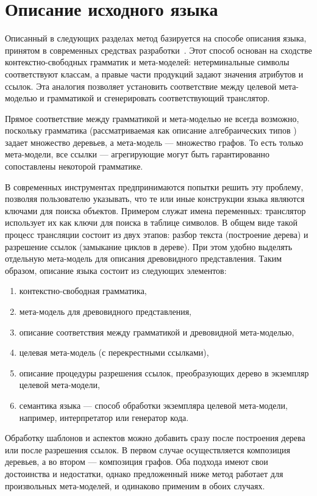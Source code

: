 \chapter{Описание исходного языка}

Описанный в следующих разделах метод базируется на способе описания языка, принятом в современных средствах разработки~\cite{xText}. Этот способ основан на сходстве контекстно-свободных грамматик и мета-моделей: нетерминальные символы соответствуют классам, а правые части продукций задают значения атрибутов и ссылок. Эта аналогия позволяет установить соответствие между целевой мета-моделью и грамматикой и сгенерировать соответствующий транслятор.

Прямое соответствие между грамматикой и мета-моделью не всегда возможно, поскольку грамматика (рассматриваемая как описание алгебраических типов \cite{?}) задает множество деревьев, а мета-модель --- множество графов. То есть только мета-модели, все ссылки --- агрегирующие могут быть гарантированно сопоставлены некоторой грамматике.

В современных инструментах предпринимаются попытки решить эту проблему, позволяя пользователю указывать, что те или иные конструкции языка являются ключами для поиска объектов. Примером служат имена переменных: транслятор использует их как ключи для поиска в таблице символов. В общем виде такой процесс трансляции состоит из двух этапов: разбор текста (построение дерева) и разрешение ссылок (замыкание циклов в дереве).
При этом удобно выделять отдельную мета-модель для описания древовидного представления. Таким образом, описание языка состоит из следующих элементов:
\begin{enumerate}
\item контекстно-свободная грамматика,
\item мета-модель для древовидного представления,
\item описание соответствия между грамматикой и древовидной мета-моделью,
\item целевая мета-модель (с перекрестными ссылками),
\item описание процедуры разрешения ссылок, преобразующих дерево в экземпляр целевой мета-модели,
\item семантика языка --- способ обработки экземпляра целевой мета-модели, например, интерпретатор или генератор кода.
\end{enumerate}

Обработку шаблонов и аспектов можно добавить сразу после построения дерева или после разрешения ссылок. В первом случае осуществляется композиция деревьев, а во втором --- композиция графов. Оба подхода имеют свои достоинства и недостатки, однако предложенный ниже метод работает для произвольных мета-моделей, и одинаково применим в обоих случаях.

%

